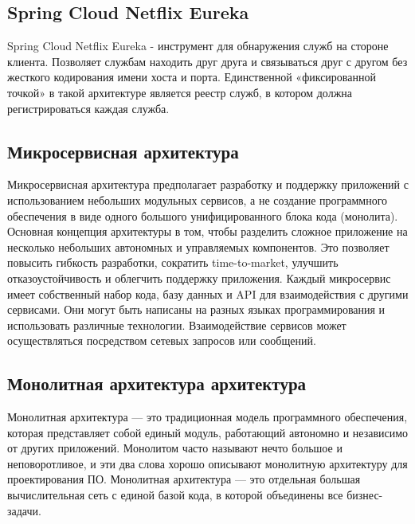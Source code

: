     \subsection*{Spring Cloud Netflix Eureka}
        Spring Cloud Netflix Eureka - инструмент для обнаружения служб на стороне клиента. Позволяет службам находить друг друга и связываться друг с другом без жесткого кодирования имени хоста и порта. Единственной «фиксированной точкой» в такой архитектуре является реестр служб, в котором должна регистрироваться каждая служба.

    \subsection*{Микросервисная архитектура}
        Микросервисная архитектура предполагает разработку и поддержку приложений с использованием небольших модульных сервисов, а не создание программного обеспечения в виде одного большого унифицированного блока кода (монолита). Основная концепция архитектуры в том, чтобы разделить сложное приложение на несколько небольших автономных и управляемых компонентов. Это позволяет повысить гибкость разработки, сократить time-to-market, улучшить отказоустойчивость и облегчить поддержку приложения.
        Каждый микросервис имеет собственный набор кода, базу данных и API для взаимодействия с другими сервисами. Они могут быть написаны на разных языках программирования и использовать различные технологии. Взаимодействие сервисов может осуществляться посредством сетевых запросов или сообщений.

    \subsection*{Монолитная архитектура архитектура}
        Монолитная архитектура — это традиционная модель программного обеспечения, которая представляет собой единый модуль, работающий автономно и независимо от других приложений. Монолитом часто называют нечто большое и неповоротливое, и эти два слова хорошо описывают монолитную архитектуру для проектирования ПО. Монолитная архитектура — это отдельная большая вычислительная сеть с единой базой кода, в которой объединены все бизнес-задачи.

\clearpage